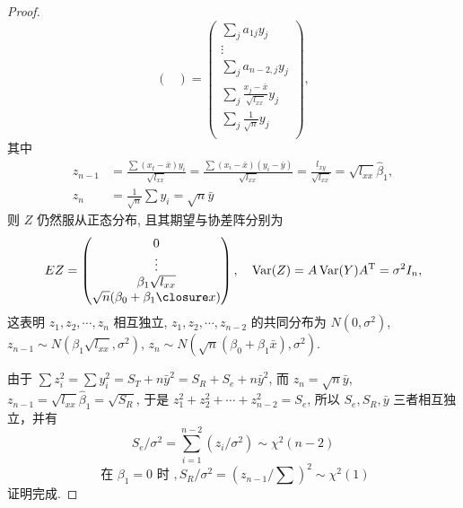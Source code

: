 \begin{proof}
\begin{equation*}
\begin{pmatrix}
\end{pmatrix}
=
\begin{pmatrix}
\sum_j{a}_{1j} y_{j}\\
\vdots\\
\displaystyle\sum_j{a}_{n-2, j} y_j\\
\displaystyle\sum_j{\frac{x_j-\bar{x}}{\sqrt{l_{xx}}}} y_j\\
\displaystyle\sum_j{\frac{1}{\sqrt{n}}} y_j\\
\end{pmatrix},
\end{equation*}
其中
\begin{equation*}
\begin{split}
z_{n-1} & = \frac{\sum(x_{t}-\bar{x}) y_{i}}{\sqrt{l_{x x}}} =
\frac{\sum(x_{i}-\bar{x})(y_{i}-\bar{y})}{\sqrt{l_{x x}}} =
\frac{l_{x y}}{\sqrt{l_{x x}}} =
\sqrt{l_{x x}} \hat{\beta}_{1}, \\
z_{n} & =\frac{1}{\sqrt{n}}\sum y_{i}=\sqrt{n} \bar{y}
\end{split}
\end{equation*}
则 ${Z}$ 仍然服从正态分布, 且其期望与协差阵分别为
\begin{equation*}
EZ =
  \begin{pmatrix}
    0      \\
    \vdots \\
    \beta_{1}\sqrt{l_{xx}} \\
    \sqrt{n}(\beta_{0} + \beta_{1} \bar{x}) \\
  \end{pmatrix},
  \quad
  \Var(Z) = A \Var(Y) A^{\mathrm{T}} =\sigma^2 I_{n},
\end{equation*}
这表明 $z_1, z_2, \cdots, z_n$ 相互独立, $z_1, z_2, \cdots, z_{n-2}$ 的共同分布为 $N(0,\sigma^2)$, $z_{n-1} \sim N(\beta_{1} \sqrt{l_{xx}},\sigma^2)$, $z_{n} \sim N(\sqrt{n} (\beta_0 + \beta_{1} \bar{x}),\sigma^2)$.

由于 $\sum z_{i}^{2} =\sum y_{i}^{2} = S_{T} + n \bar{y}^2 = S_{R} + S_{e} + n \bar{y}^2$, 而 $z_n = \sqrt{n} \bar{y}$, $z_{n-1} = \sqrt{l_{xx}}\hat{\beta}_{1} = \sqrt{S_{R}}$, 于是 $z_{1}^2 + z_{2}^2 + \cdots + z_{n-2}^2 = S_{e}$, 所以 $S_{e}, S_{R}, \bar{y}$ 三者相互独立，并有
\begin{equation*}
S_{e} /\sigma^2=\sum_{i=1}^{n-2}\left(z_{i} /\sigma^2\right) \sim \chi^{2}(n-2)
\end{equation*}
\begin{equation*}
\text{ 在 }\beta_{1}=0 \text { 时 }, S_{R} /\sigma^2=\left(z_{n-1} /\sum\right)^{2} \sim \chi^{2}(1)
\end{equation*}
证明完成.
\end{proof}

